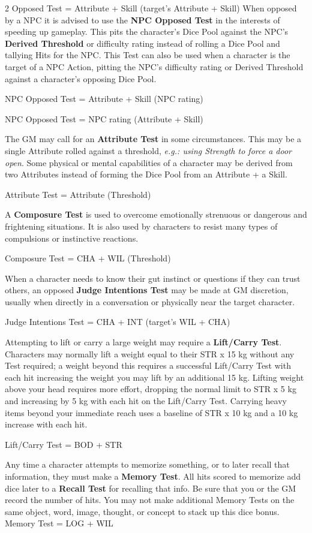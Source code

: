 \documentclass[
  oneside]{article}
\begin{document}
\begin{multicols}{2}
Opposed Test = Attribute + Skill (target's
Attribute + Skill) When opposed by a NPC it is
advised to use the \textbf{NPC Opposed Test} in
the interests of speeding up gameplay. This pits
the character's Dice Pool against the NPC's
\textbf{Derived Threshold} or difficulty rating
instead of rolling a Dice Pool and tallying Hits
for the NPC. This Test can also be used when a
character is the target of a NPC Action, pitting
the NPC's difficulty rating or Derived Threshold
against a character's opposing Dice Pool.

NPC Opposed Test = Attribute + Skill (NPC rating)

NPC Opposed Test = NPC rating (Attribute + Skill)

The GM may call for an \textbf{Attribute Test} in
some circumstances. This may be a single Attribute
rolled against a threshold, \emph{e.g.: using
Strength to force a door open}. Some physical or
mental capabilities of a character may be derived
from two Attributes instead of forming the Dice
Pool from an Attribute + a Skill.

Attribute Test = Attribute (Threshold)

A \textbf{Composure Test} is used to overcome
emotionally strenuous or dangerous and frightening
situations. It is also used by characters to
resist many types of compulsions or instinctive
reactions.

Composure Test = CHA + WIL (Threshold)

When a character needs to know their gut instinct
or questions if they can trust others, an opposed
\textbf{Judge Intentions Test} may be made at GM
discretion, usually when directly in a
conversation or physically near the target
character.

Judge Intentions Test = CHA + INT (target's WIL +
CHA)

Attempting to lift or carry a large weight may
require a \textbf{Lift/Carry Test}. Characters may
normally lift a weight equal to their STR x 15 kg
without any Test required; a weight beyond this
requires a successful Lift/Carry Test with each
hit increasing the weight you may lift by an
additional 15 kg. Lifting weight above your head
requires more effort, dropping the normal limit to
STR x 5 kg and increasing by 5 kg with each hit on
the Lift/Carry Test. Carrying heavy items beyond
your immediate reach uses a baseline of STR x 10
kg and a 10 kg increase with each hit.

Lift/Carry Test = BOD + STR

Any time a character attempts to memorize
something, or to later recall that information,
they must make a \textbf{Memory Test}. All hits
scored to memorize add dice later to a
\textbf{Recall Test} for recalling that info. Be
sure that you or the GM record the number of hits.
You may not make additional Memory Tests on the
same object, word, image, thought, or concept to
stack up this dice bonus. Memory Test = LOG + WIL


\end{multicols}
\end{document}
